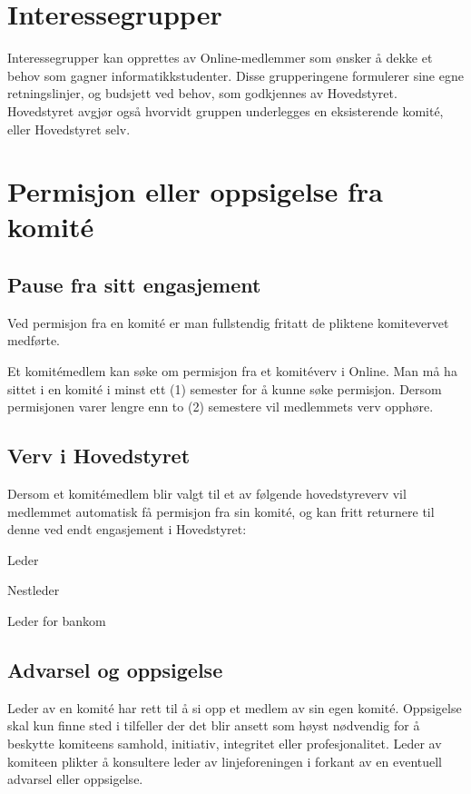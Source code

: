 \section{Interessegrupper}
\vspace{23pt}
Interessegrupper kan opprettes av Online-medlemmer som ønsker å dekke et behov som gagner informatikkstudenter. Disse grupperingene formulerer sine egne retningslinjer, og budsjett ved behov, som godkjennes av Hovedstyret. Hovedstyret avgjør også hvorvidt gruppen underlegges en eksisterende komité, eller Hovedstyret selv. 


\section{Permisjon eller oppsigelse fra komité}
\vspace{23pt}

\subsection{Pause fra sitt engasjement}{
Ved permisjon fra en komité er man fullstendig fritatt de pliktene komitevervet medførte. 

Et komitémedlem kan søke om permisjon fra et komitéverv i Online. Man må ha sittet i en komité i minst ett (1) semester for å kunne søke permisjon. Dersom permisjonen varer lengre enn to (2) semestere vil medlemmets verv opphøre.
}

\subsection{Verv i Hovedstyret}{
Dersom et komitémedlem blir valgt til et av følgende hovedstyreverv vil medlemmet automatisk få permisjon fra sin komité, og kan fritt \linebreak returnere til denne ved endt engasjement i Hovedstyret:
\begin{liste}
	\item Leder
	\item Nestleder
	\item Leder for bankom
\end{liste}
}

\subsection{Advarsel og oppsigelse}{
Leder av en komité har rett til å si opp et medlem av sin egen komité. Oppsigelse skal kun finne sted i tilfeller der det blir ansett som høyst nødvendig for å beskytte komiteens samhold, initiativ, integritet eller profesjonalitet. Leder av komiteen plikter å konsultere leder av linjeforeningen i forkant av en eventuell advarsel eller oppsigelse.
}

